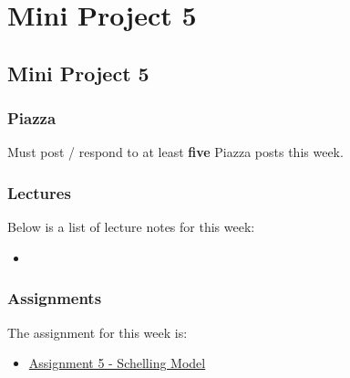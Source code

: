 \clearpage

\renewcommand{\ChapTitle}{Mini Project 5}
\renewcommand{\SectionTitle}{Mini Project 5}

\chapter{\ChapTitle}
\section{\SectionTitle}

\subsection{Piazza}

Must post / respond to at least \textbf{five} Piazza posts this week.

\subsection{Lectures}

\noindent Below is a list of lecture notes for this week:

\begin{itemize}
    \item {}
\end{itemize}

\subsection{Assignments}

The assignment for this week is:

\begin{itemize}
    \item \href{https://github.com/QuantumCompiler/CU/tree/main/CSPB%203702%20-%20Cognitive%20Science/CSPB%203702%20-%20Assignments/CSPB%203702%20-%20Assignment%205%20-%20Schelling%20Model}{Assignment 5 - Schelling Model}
\end{itemize}